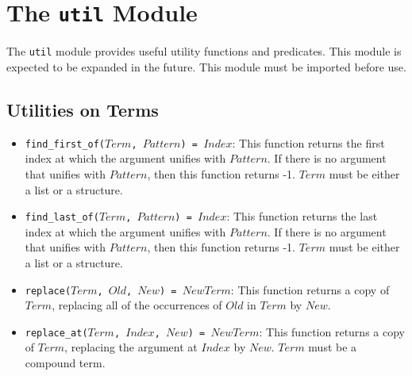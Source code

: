 \chapter{The \texttt{util} Module}
The \texttt{util} module provides useful utility functions and predicates. This module is expected to be expanded in the future. This module must be imported before use.

\section{Utilities on Terms}
\begin{itemize}
\item \texttt{find\_first\_of($Term$, $Pattern$) = $Index$}: This function returns the first index at which the argument unifies with $Pattern$. If there is no argument that unifies with $Pattern$, then this function returns -1. $Term$ must be either a list or a structure.
\item \texttt{find\_last\_of($Term$, $Pattern$) = $Index$}: This function returns the last index at which the argument unifies with $Pattern$. If there is no argument that unifies with $Pattern$, then this function returns -1. $Term$ must be either a list or a structure.
\item \texttt{replace($Term$, $Old$, $New$) = $NewTerm$}: This function returns a copy of $Term$, replacing all of the occurrences of $Old$ in $Term$ by $New$.
\item \texttt{replace\_at($Term$, $Index$, $New$) = $NewTerm$}: This function returns a copy of $Term$, replacing the argument at $Index$ by $New$. $Term$ must be a compound term.
\end{itemize}


